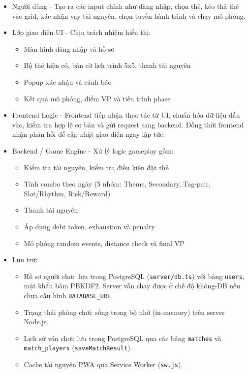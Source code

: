 \begin{itemize}[topsep=0pt, itemsep=2.5pt, leftmargin=1.5cm]
    \item Người dùng - Tạo ra các input chính như đăng nhập, chọn thẻ, kéo thả thẻ vào grid, xác nhận vay tài nguyên, chọn tuyến hành trình và chạy mô phỏng.

    \item Lớp giao diện UI - Chịu trách nhiệm hiển thị:
    \begin{itemize}[label=, leftmargin=1.5cm]
        \item Màn hình đăng nhập và hồ sơ
        \item Bộ thẻ hiện có, bàn cờ lịch trình 5x5, thanh tài nguyên
        \item Popup xác nhận và cảnh báo
        \item Kết quả mô phỏng, điểm VP và tiến trình phase
    \end{itemize}

    \item Frontend Logic - Frontend tiếp nhận thao tác từ UI, chuẩn hóa dữ liệu đầu vào, kiểm tra hợp lệ cơ bản và gửi request sang backend. Đồng thời frontend nhận phản hồi để cập nhật giao diện ngay lập tức.

    \item Backend / Game Engine - Xử lý logic gameplay gồm:
    \begin{itemize}[label=, leftmargin=1.5cm]
        \item Kiểm tra tài nguyên, kiểm tra điều kiện đặt thẻ
        \item Tính combo theo ngày (5 nhóm: Theme, Secondary, Tag-pair, Slot/Rhythm, Risk/Reward)
        \item Thanh tài nguyên
        \item Áp dụng debt token, exhaustion và penalty
        \item Mô phỏng random events, distance check và final VP
    \end{itemize}

    \item Lưu trữ:
        \begin{itemize}[label=, leftmargin=1.5cm]
        \item Hồ sơ người chơi: lưu trong PostgreSQL (\texttt{server/db.ts}) với bảng \texttt{users}, mật khẩu băm PBKDF2. Server vẫn chạy được ở chế độ không-DB nếu chưa cấu hình \texttt{DATABASE\_URL}.
        \item Trạng thái phòng chơi: sống trong bộ nhớ (in-memory) trên server Node.js.
        \item Lịch sử ván chơi: lưu trong PostgreSQL qua các bảng \texttt{matches} và \texttt{match\_players} (\texttt{saveMatchResult}).
        \item Cache tài nguyên PWA qua Service Worker (\texttt{sw.js}).
    \end{itemize}
\end{itemize}

